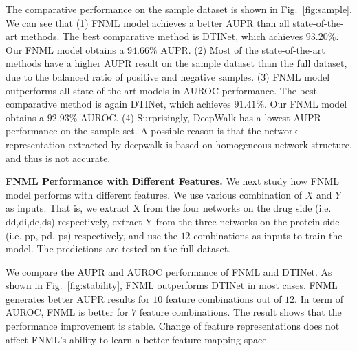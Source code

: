 \documentclass[conference]{IEEEtran}
\begin{document}
The comparative performance on the sample dataset is shown in Fig.~\ref{fig:sample}. We can see that (1) FNML model achieves a better AUPR than all state-of-the-art methods. The best comparative method is DTINet, which achieves $93.20\%$. Our FNML model obtains a $94.66\%$ AUPR. (2) Most of the state-of-the-art methods have a higher AUPR result on the sample dataset than the full dataset, due to the balanced ratio of positive and negative samples. (3) FNML model outperforms all state-of-the-art models in AUROC performance.  The best comparative method is again DTINet, which achieves $91.41\%$. Our FNML model obtains a $92.93\%$ AUROC. (4) Surprisingly, DeepWalk has a lowest AUPR performance on the sample set. A possible reason is that the network representation extracted by deepwalk is based on homogeneous network structure, and thus is not accurate. 

\textbf{FNML Performance with Different Features.} We next study how FNML model performs with different features. We use various combination of $X$ and $Y$ as inputs. That is, we extract X from the four networks on the drug side (i.e. dd,di,de,ds) respectively, extract Y from the three networks on the protein side (i.e. pp, pd, ps) respectively, and use the $12$ combinations as inputs to train the model. The predictions are tested on the full dataset.

We compare the AUPR and AUROC performance of FNML and DTINet. As shown in Fig.~\ref{fig:stability}, FNML outperforms DTINet in most cases. FNML generates better AUPR results for $10$ feature combinations out of $12$. In term of AUROC, FNML is better for $7$ feature combinations. The result shows that the performance improvement is stable. Change of feature representations does not affect FNML's ability to learn a better feature mapping space.
\end{document}
